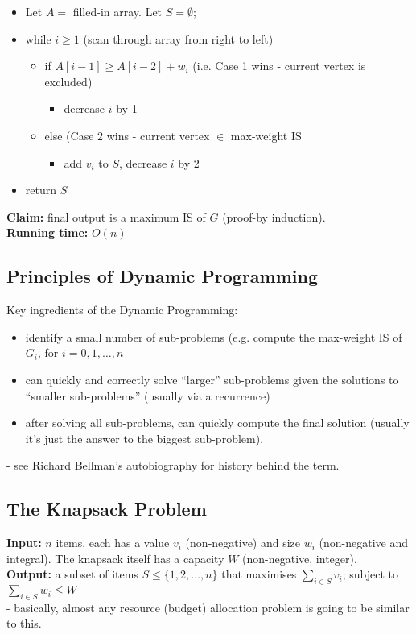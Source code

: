 \documentclass{scrartcl}
\begin{document}
\begin{itemize}
\item Let $A = $ filled-in array. Let $S = \emptyset$;
\item while $i \geq 1$ (scan through array from right to left)
  \begin{itemize}
  \item if $A[i-1] \geq A[i-2] +w_i$ (i.e. Case 1 wins - current vertex is
    excluded)
    \begin{itemize}
    \item decrease $i$ by 1
    \end{itemize}
  \item else (Case 2 wins - current vertex $\in$ max-weight IS
    \begin{itemize}
    \item add $v_i$ to $S$, decrease $i$ by 2
    \end{itemize}
  \end{itemize}
\item return $S$
\end{itemize}
{\bf Claim: } final output is a maximum IS of $G$ (proof-by induction).\\
{\bf Running time: } $O(n)$

\subsection{Principles of Dynamic Programming}
\label{sec:8-5}
Key ingredients of the Dynamic Programming:
\begin{itemize}
\item identify a small number of sub-problems (e.g. compute the max-weight IS of
  $G_i$, for $i=0, 1, \dots, n$
\item can quickly and correctly solve ``larger'' sub-problems given the solutions
  to ``smaller sub-problems'' (usually via a recurrence)
\item after solving all sub-problems, can quickly compute the final solution
  (usually it's just the answer to the biggest sub-problem).
\end{itemize}
- see Richard Bellman's autobiography for history behind the term.

\subsection{The Knapsack Problem}
\label{sec:9-1}
{\bf Input: } $n$ items, each has a value $v_i$ (non-negative) and size $w_i$
(non-negative and integral). The knapsack itself has a capacity $W$
(non-negative, integer).\\
{\bf Output: } a subset of items $S \leq \{1, 2, \dots, n\}$ that maximises
$\sum \limits_{i \in S} v_i$; subject to $\sum \limits_{i \in S} w_i \leq W$\\
- basically, almost any resource (budget) allocation problem is going to be
similar to this. 
\end{document}
